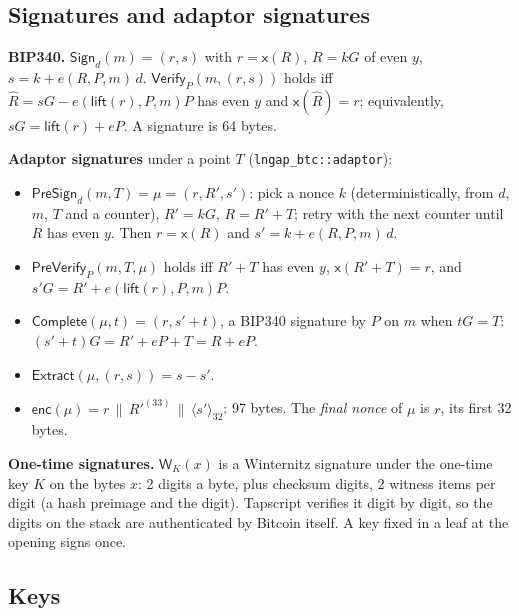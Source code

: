 \documentclass[11pt]{article}
\theoremstyle{plain}
\theoremstyle{definition}
\newcommand{\tx}[1]{\texttt{#1}}
\newcommand{\cat}{\,\|\,}
\newcommand{\be}[2]{\langle #1\rangle_{#2}}          %
\newcommand{\xo}[1]{\mathsf{x}(#1)}                  %
\newcommand{\Sign}{\mathsf{Sign}}
\newcommand{\Vfy}{\mathsf{Verify}}
\newcommand{\PSign}{\mathsf{PreSign}}
\newcommand{\PVfy}{\mathsf{PreVerify}}
\newcommand{\Compl}{\mathsf{Complete}}
\newcommand{\Extr}{\mathsf{Extract}}
\newcommand{\Wots}{\mathsf{W}}
\newcommand{\enc}{\mathsf{enc}}
\begin{document}
\subsection{Signatures and adaptor signatures}

\textbf{BIP340.} $\Sign_d(m) = (r, s)$ with $r = \xo{R}$, $R = kG$ of
even $y$, $s = k + e(R, P, m)\,d$. $\Vfy_P(m, (r, s))$ holds iff $\hat R
= sG - e(\mathsf{lift}(r), P, m)P$ has even $y$ and $\xo{\hat R} = r$;
equivalently, $sG = \mathsf{lift}(r) + eP$. A signature is 64 bytes.

\textbf{Adaptor signatures} under a point $T$ (\tx{lngap\_btc::adaptor}):
\begin{itemize}[nosep]
\item $\PSign_d(m, T) = \mu = (r, R', s')$: pick a nonce $k$
  (deterministically, from $d$, $m$, $T$ and a counter), $R' = kG$, $R
  = R' + T$; retry with the next counter until $R$ has even $y$. Then
  $r = \xo{R}$ and $s' = k + e(R, P, m)\,d$.
\item $\PVfy_P(m, T, \mu)$ holds iff $R' + T$ has even $y$, $\xo{R' + T} =
  r$, and $s'G = R' + e(\mathsf{lift}(r), P, m)P$.
\item $\Compl(\mu, t) = (r, s' + t)$, a BIP340 signature by $P$ on $m$
  when $tG = T$: $(s' + t)G = R' + eP + T = R + eP$.
\item $\Extr(\mu, (r, s)) = s - s'$.
\item $\enc(\mu) = r \cat R'^{(33)} \cat \be{s'}{32}$: 97 bytes. The
  \emph{final nonce} of $\mu$ is $r$, its first 32 bytes.
\end{itemize}

\textbf{One-time signatures.} $\Wots_K(x)$ is a Winternitz signature
under the one-time key $K$ on the bytes $x$: 2 digits a byte, plus
checksum digits, 2 witness items per digit (a hash preimage and the
digit). Tapscript verifies it digit by digit, so the digits on the
stack are authenticated by Bitcoin itself. A key fixed in a leaf at the
opening signs once.

\subsection{Keys}
\end{document}
